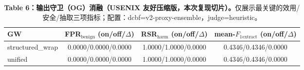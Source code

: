 \begin{table}[t]
\centering\small
\setlength{\tabcolsep}{3pt}
\begin{tabularx}{\columnwidth}{@{}lccc@{}}
\toprule
\textbf{GW} & \textbf{FPR$_{\mathrm{benign}}$ (on/off/$\Delta$)} & \textbf{RSR$_{\mathrm{harm}}$ (on/off/$\Delta$)} & \textbf{mean-$F_1$$_{\mathrm{extract}}$ (on/off/$\Delta$)} \\
\midrule
structured\_wrap & 0.0000/0.0000/0.0000 & 1.0000/1.0000/0.0000 & 0.4346/0.4346/0.0000 \\
unified & 0.0000/0.0000/0.0000 & 1.0000/1.0000/0.0000 & 0.4346/0.4346/0.0000 \\
\bottomrule
\end{tabularx}
\caption{\textbf{Table 6：输出守卫（OG）消融（USENIX 友好压缩版，本次复现切片）。}仅展示最关键的效用/安全/抽取三项指标；配置：dcbf=v2-proxy-ensemble，judge=heuristic。}
\label{tab:tracka-guard-cn}
\end{table}

